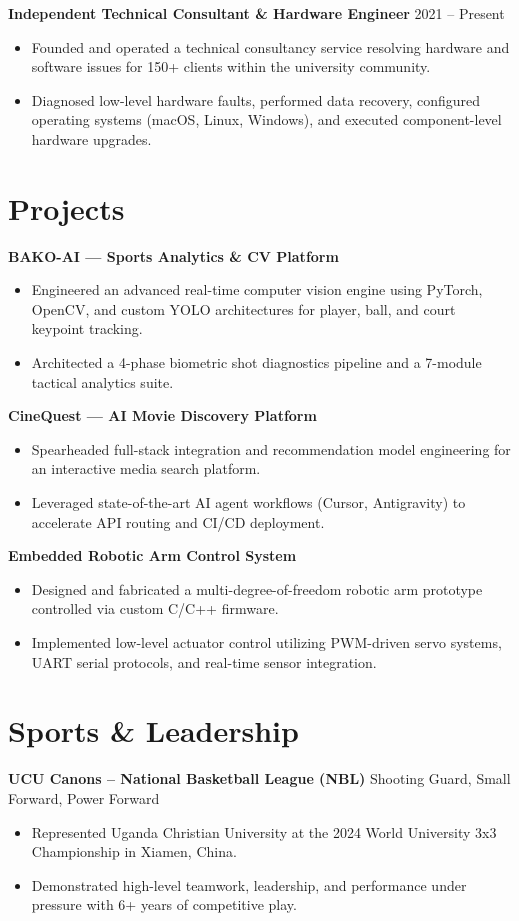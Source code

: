 \documentclass[a4paper,10pt]{article}
\begin{document}
\textbf{Independent Technical Consultant \& Hardware Engineer} \hfill 2021 – Present
\begin{itemize}[leftmargin=*, noitemsep]
    \item Founded and operated a technical consultancy service resolving hardware and software issues for 150+ clients within the university community.
    \item Diagnosed low-level hardware faults, performed data recovery, configured operating systems (macOS, Linux, Windows), and executed component-level hardware upgrades.
\end{itemize}

\section{Projects}
\textbf{BAKO-AI — Sports Analytics \& CV Platform}
\begin{itemize}[leftmargin=*, noitemsep]
    \item Engineered an advanced real-time computer vision engine using PyTorch, OpenCV, and custom YOLO architectures for player, ball, and court keypoint tracking.
    \item Architected a 4-phase biometric shot diagnostics pipeline and a 7-module tactical analytics suite.
\end{itemize}

\textbf{CineQuest — AI Movie Discovery Platform}
\begin{itemize}[leftmargin=*, noitemsep]
    \item Spearheaded full-stack integration and recommendation model engineering for an interactive media search platform.
    \item Leveraged state-of-the-art AI agent workflows (Cursor, Antigravity) to accelerate API routing and CI/CD deployment.
\end{itemize}

\textbf{Embedded Robotic Arm Control System}
\begin{itemize}[leftmargin=*, noitemsep]
    \item Designed and fabricated a multi-degree-of-freedom robotic arm prototype controlled via custom C/C++ firmware.
    \item Implemented low-level actuator control utilizing PWM-driven servo systems, UART serial protocols, and real-time sensor integration.
\end{itemize}

\section{Sports \& Leadership}
\textbf{UCU Canons – National Basketball League (NBL)} \hfill Shooting Guard, Small Forward, Power Forward
\begin{itemize}[leftmargin=*, noitemsep]
    \item Represented Uganda Christian University at the 2024 World University 3x3 Championship in Xiamen, China.
    \item Demonstrated high-level teamwork, leadership, and performance under pressure with 6+ years of competitive play.
\end{itemize}
\end{document}
